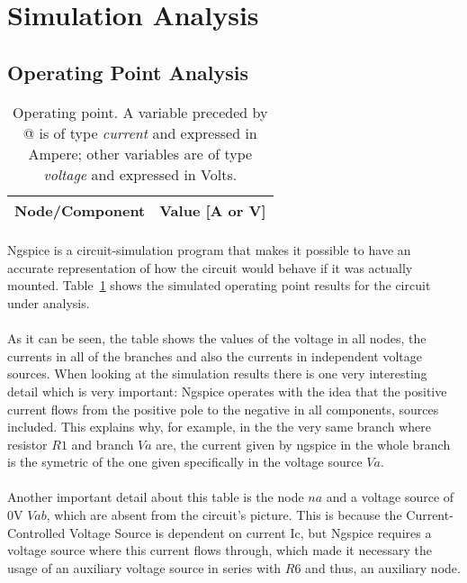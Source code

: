 \section{Simulation Analysis}
\label{sec:simulation}

\subsection{Operating Point Analysis}
\begin{table}[h]
  \centering
  \begin{tabular}{|l|r|}
    \hline    
    {\bf Node/Component} & {\bf Value [A or V]} \\ \hline
    
  \end{tabular}
  \caption{Operating point. A variable preceded by @ is of type {\em current}
    and expressed in Ampere; other variables are of type {\it voltage} and expressed in
    Volts.}
  \label{tab:op}
\end{table}



\paragraph{}Ngspice is a circuit-simulation program that makes it possible to have an accurate representation of how the circuit would behave if it was actually mounted. Table~\ref{tab:op} shows the simulated operating point results for the circuit
under analysis.


\paragraph{}As it can be seen, the table shows the values of the voltage in all nodes, the currents in all of the branches and also the currents in independent voltage sources. When looking at the simulation results there is one very interesting detail which is very important: Ngspice operates with the idea that the positive current flows from the positive pole to the negative in all components, sources included. This explains why, for example, in the the very same branch where resistor $R1$ and branch $Va$ are, the current given by ngspice in the whole branch is the symetric of the one given specifically in the voltage source $Va$.
\paragraph{} Another important detail about this table is the node $na$ and a voltage source of 0V $Vab$, which are absent from the circuit's picture. This is because the Current-Controlled Voltage Source is dependent on current Ic, but Ngspice requires a voltage source where this current flows through, which made it necessary the usage of an auxiliary voltage source in series with $R6$ and thus, an auxiliary node.  


